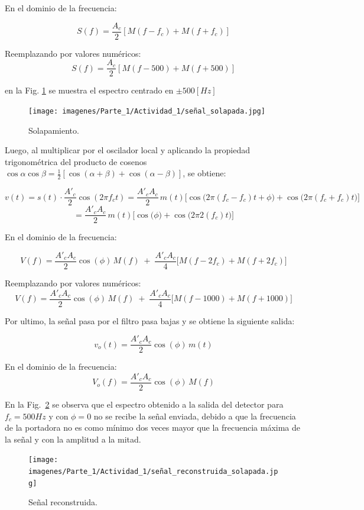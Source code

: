 En el dominio de la frecuencia:

\[
S(f) = \frac{A_c}{2} \left[ M(f-f_c) + M(f+f_c) \right]
\]

Reemplazando por valores numéricos:
\[
S(f) = \frac{A_c}{2} \left[ M(f-500) + M(f+500) \right]
\]

en la Fig. \ref{fig:1a_solapamiento} se muestra el espectro centrado en $\pm 500 [Hz]$

    \begin{figure}[H]
        \centering
        \texttt{[image: imagenes/Parte\_1/Actividad\_1/señal\_solapada.jpg]}
        \caption{Solapamiento.}
        \label{fig:1a_solapamiento}
    \end{figure}
    
Luego, al multiplicar por el oscilador local y aplicando la propiedad trigonométrica del producto de cosenos $\cos\alpha \cos\beta = \tfrac{1}{2}\left[\cos(\alpha+\beta)+\cos(\alpha-\beta)\right]$, se obtiene:

\[
v(t) = s(t) \cdot \frac{A'_c}{2} \cos(2\pi f_c t) =  \frac{A'_c A_c}{2} \, m(t) \Big[ \cos\big(2\pi(f_c-f_c)t + \phi \big)  + \cos\big(2\pi(f_c+f_c)t\big) \Big]
\]
\[
 = \frac{A'_c A_c}{2} \, m(t) \Big[\cos\big(\phi \big)  + \cos\big(2\pi2(f_c)t\big) \Big] 
\]

En el dominio de la frecuencia:

\[
V(f) = \frac{A'_c A_c}{2}\cos(\phi)\, M(f) \;+\; \frac{A'_c A_c}{4}\Big[ M(f-2f_c) + M(f+2f_c) \Big]
\]

Reemplazando por valores numéricos: 
\[
V(f) = \frac{A'_c A_c}{2}\cos(\phi)\, M(f) \;+\; \frac{A'_c A_c}{4}\Big[ M(f-1000) + M(f+1000) \Big]
\]

Por ultimo, la señal pasa por el filtro pasa bajas y se obtiene la siguiente salida:

\[
v_o(t) = \frac{A'_c A_c}{2}\cos(\phi)\, m(t) 
\]

En el dominio de la frecuencia:
\[
V_o(f) = \frac{A'_c A_c}{2}\cos(\phi)\, M(f) 
\]

En la  Fig.~\ref{fig:señal_reconstruida_solapada} se observa que el espectro obtenido a la salida del detector para $f_c=500 Hz$ y con $\phi = 0$ no se recibe la señal enviada, debido a que la frecuencia de la portadora no es como mínimo dos veces mayor que la frecuencia máxima de la señal y con la amplitud a la mitad.

\begin{figure} [H]
    \centering
    \texttt{[image: imagenes/Parte\_1/Actividad\_1/señal\_reconstruida\_solapada.jpg]}
    \caption{Señal reconstruida.}
    \label{fig:señal_reconstruida_solapada}
\end{figure}
    
